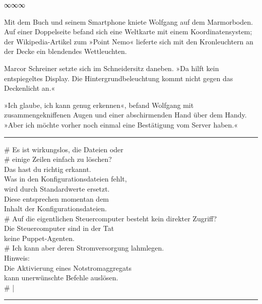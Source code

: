 \begin{center}
∞∞∞
\end{center}

Mit dem Buch und seinem Smartphone kniete Wolfgang auf dem Marmorboden. Auf einer Doppelseite befand sich eine Weltkarte mit einem Koordinatensystem; der Wikipedia-Artikel zum »Point Nemo« lieferte sich mit den Kronleuchtern an der Decke ein blendendes Wettleuchten.

Marcor Schreiner setzte sich im Schneidersitz daneben. »Da hilft kein entspiegeltes Display. Die Hintergrundbeleuchtung kommt nicht gegen das Deckenlicht an.«

»Ich glaube, ich kann genug erkennen«, befand Wolfgang mit zusammengekniffenen Augen und einer abschirmenden Hand über dem Handy. »Aber ich möchte vorher noch einmal eine Bestätigung vom Server haben.«

\noindent \parbox{\textwidth}{ \vspace{3ex} \hrule \vspace{3ex}

    \begin{footnotesize}
    \begin{ttfamily}

\noindent \# Es ist wirkungslos, die Dateien oder\\
\noindent \# einige Zeilen einfach zu löschen?\\
\noindent Das hast du richtig erkannt.\\
\noindent Was in den Konfigurationsdateien fehlt,\\
\noindent wird durch Standardwerte ersetzt.\\
\noindent Diese entsprechen momentan dem\\
\noindent Inhalt der Konfigurationsdateien.\\
\noindent \# Auf die eigentlichen Steuercomputer besteht kein direkter Zugriff?\\
\noindent Die Steuercomputer sind in der Tat\\
\noindent keine Puppet-Agenten.\\
\noindent \# Ich kann aber deren Stromversorgung lahmlegen.\\
\noindent Hinweis:\\
\noindent Die Aktivierung eines Notstromaggregats\\
\noindent kann unerwünschte Befehle auslösen.\\
\noindent \# |

    \end{ttfamily}
    \end{footnotesize}

\vspace{3ex} \hrule \vspace{3ex} }

